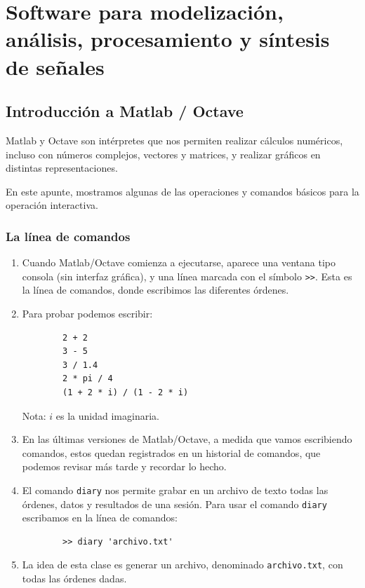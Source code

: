 \chapter{Software para modelización, análisis, procesamiento y síntesis de señales}

\section{Introducción a Matlab / Octave}

Matlab y Octave son intérpretes que nos permiten realizar cálculos numéricos, incluso con números complejos, vectores y matrices, y realizar gráficos en distintas representaciones.

En este apunte, mostramos algunas de las operaciones y comandos básicos para la operación interactiva. 

\subsection{La línea de comandos}

\begin{enumerate}
	
	\item Cuando Matlab/Octave comienza a ejecutarse, aparece una ventana tipo consola (sin interfaz gráfica), y una línea marcada con el símbolo \verb->>-. Esta es la línea de comandos, donde escribimos las diferentes órdenes.
	
	\item Para probar podemos escribir:
	\begin{verbatim}
		2 + 2
		3 - 5
		3 / 1.4
		2 * pi / 4
		(1 + 2 * i) / (1 - 2 * i)
	\end{verbatim}
	Nota: $i$ es la unidad imaginaria.
	
	\item En las últimas versiones de Matlab/Octave, a medida que vamos escribiendo comandos, estos quedan registrados en un historial de comandos, que podemos revisar más tarde y recordar lo hecho.
	
	\item El comando \texttt{diary} nos permite grabar en un archivo de texto todas las órdenes, datos y resultados de una sesión. Para usar el comando \texttt{diary} escribamos en la línea de comandos:
	\begin{verbatim}
		>> diary 'archivo.txt'
	\end{verbatim}
	
	\item La idea de esta clase es generar un archivo, denominado \verb-archivo.txt-, con todas las órdenes dadas.
\end{enumerate}

